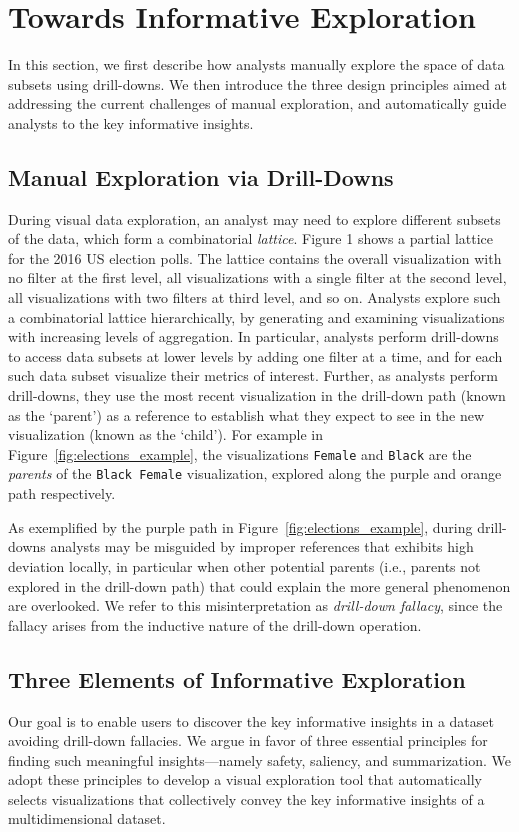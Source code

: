 \section{Towards Informative Exploration}
In this section, we first describe how analysts manually explore the space of data subsets using drill-downs. We then introduce the three design principles aimed at addressing the current challenges of manual exploration, and automatically guide analysts to the key informative insights. 
\subsection{Manual Exploration via Drill-Downs}
During visual data exploration, an analyst may need to explore different subsets of the data, which form a combinatorial \emph{lattice}. Figure 1 shows a partial lattice for the 2016 US election polls. The lattice contains the overall visualization with no filter at the first level, all visualizations with a single filter at the second level, all visualizations with two filters at third level, and so on. Analysts explore such a combinatorial lattice hierarchically, by generating and examining visualizations with increasing levels of aggregation. In particular, analysts perform drill-downs to access data subsets at lower levels by adding one filter at a time, and for each such data subset visualize their metrics of interest. Further, as analysts perform drill-downs, they use the most recent visualization in the drill-down path (known as the `parent') as a reference to establish what they expect to see in the new visualization (known as the `child'). For example in Figure~\ref{fig:elections_example}, the visualizations \texttt{Female} and \texttt{Black} are the \emph{parents} of the \texttt{Black Female} visualization, explored along the purple and orange path respectively.
\par As exemplified by the purple path in Figure~\ref{fig:elections_example}, during drill-downs analysts may be misguided by improper references that exhibits high deviation locally, in particular when other potential parents (i.e., parents not explored in the drill-down path) that could explain the more general phenomenon are overlooked. We refer to this misinterpretation as \emph{drill-down fallacy}, since the fallacy arises from the inductive nature of the drill-down operation. 
\subsection{Three Elements of Informative Exploration}
Our goal is to enable users to discover the key informative insights in a dataset avoiding drill-down fallacies. We argue in favor of three essential principles for finding such meaningful insights---namely safety, saliency, and summarization. We adopt these principles to develop a visual exploration tool that automatically selects visualizations that collectively convey the key informative insights of a multidimensional dataset.
